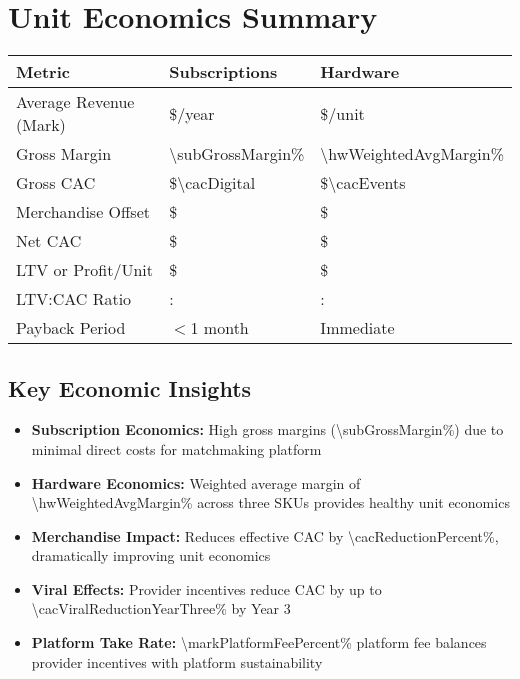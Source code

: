 
\section{Unit Economics Summary}

\begin{table}[H]
\centering
\begin{tabularx}{\linewidth}{l Y Y}
\toprule
Metric & Subscriptions & Hardware \\\midrule
Average Revenue (Mark) & \$\numint{\markWeightedAvgAnnual}/year & \$\numint{\hwWeightedAvgPrice}/unit \\
Gross Margin\cite{openview2023} & \num{\subGrossMargin}\% & \num{\hwWeightedAvgMargin}\% \\
Gross CAC & \$\num{\cacDigital} & \$\num{\cacEvents} \\
Merchandise Offset & \$\numfpeval{\merchOffsetSubsCalc} & \$\numfpeval{\merchOffsetHwCalc} \\
Net CAC & \$\numint{\cacDigital - \merchOffsetSubsCalc} & \$\numint{\cacEvents - \merchOffsetHwCalc} \\
LTV or Profit/Unit & \$\numint{\subLTV} & \$\numint{\hwWeightedAvgGP} \\
LTV:CAC Ratio & \numint{\subLTV/(\cacDigital - \merchOffsetSubsCalc)}: & \numint{\hwWeightedAvgGP/(\cacEvents - \merchOffsetHwCalc)}: \\
Payback Period & $<$\num{1} month & Immediate \\
\bottomrule
\end{tabularx}
\end{table}

\subsection{Key Economic Insights}
\begin{itemize}
    \item \textbf{Subscription Economics:} High gross margins (\num{\subGrossMargin}\%) due to minimal direct costs for matchmaking platform
    \item \textbf{Hardware Economics:} Weighted average margin of \num{\hwWeightedAvgMargin}\% across three SKUs provides healthy unit economics
    \item \textbf{Merchandise Impact:} Reduces effective CAC by \num{\cacReductionPercent}\%, dramatically improving unit economics
    \item \textbf{Viral Effects:} Provider incentives reduce CAC by up to \num{\cacViralReductionYearThree}\% by Year 3
    \item \textbf{Platform Take Rate:} \num{\markPlatformFeePercent}\% platform fee balances provider incentives with platform sustainability
\end{itemize}


